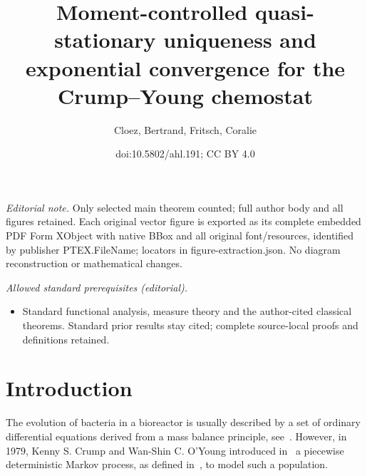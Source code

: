 \documentclass[10pt]{amsart}
\title{Moment-controlled quasi-stationary uniqueness and exponential convergence for the Crump--Young chemostat}
\author{Cloez, Bertrand, Fritsch, Coralie}
\date{doi:10.5802/ahl.191; CC BY 4.0}
\theoremstyle{definition}\newtheorem{defi}[theo]{Definition}\newtheorem{rema}[theo]{Remark}\newtheorem{exam}[theo]{Example}\newtheorem{exem}[theo]{Example}\newtheorem{nota}[theo]{Notation}
\newcommand{\1}{\mathbf{1}}
\begin{document}
\maketitle
\noindent\textit{Editorial note.} Only selected main theorem counted; full author body and all figures retained. Each original vector figure is exported as its complete embedded PDF Form XObject with native BBox and all original font/resources, identified by publisher PTEX.FileName; locators in figure-extraction.json. No diagram reconstruction or mathematical changes.\par\medskip
\noindent\textit{Allowed standard prerequisites (editorial).}\begin{itemize}
\item Standard functional analysis, measure theory and the author-cited classical theorems. Standard prior results stay cited; complete source-local proofs and definitions retained.
\end{itemize}\medskip



\section{Introduction}\label{sec:intro}



The evolution of bacteria in a bioreactor is usually described by a set of ordinary differential equations derived from a mass balance principle, see~\cite{HLRS,SW95}. However, in 1979, Kenny S. Crump and Wan-Shin C. O’Young introduced in~\cite{CY79} a piecewise deterministic Markov process, as defined in~\cite{D93}, to model such a population.
\end{document}

